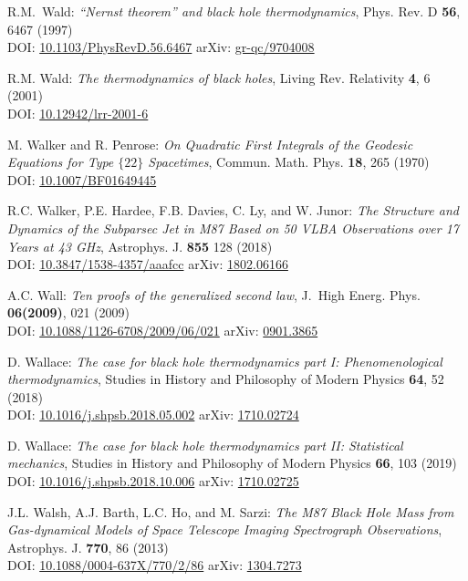 \begin{thebibliography}{123}
R.M.~Wald:
{\em ``Nernst theorem'' and black hole thermodynamics},
Phys. Rev. D {\bf 56}, 6467 (1997)\\
DOI: \href{https://doi.org/10.1103/PhysRevD.56.6467}{10.1103/PhysRevD.56.6467}\hfill
arXiv: \href{https://arxiv.org/abs/gr-qc/9704008}{gr-qc/9704008}

R.M. Wald: {\em The thermodynamics of black holes},
Living Rev. Relativity {\bf 4}, 6 (2001) \\
DOI: \href{https://doi.org/10.12942/lrr-2001-6}{10.12942/lrr-2001-6}

M. Walker and R. Penrose: {\em On Quadratic First Integrals of the Geodesic Equations
for Type $\{22\}$ Spacetimes},
Commun. Math. Phys. {\bf 18}, 265 (1970)\\
DOI: \href{https://doi.org/10.1007/BF01649445}{10.1007/BF01649445}

R.C. Walker, P.E. Hardee, F.B. Davies, C. Ly, and W. Junor:
{\em The Structure and Dynamics of the Subparsec Jet in M87 Based on 50 VLBA Observations over 17 Years at 43 GHz},
Astrophys. J. {\bf 855} 128 (2018)\\
DOI: \href{https://doi.org/10.3847/1538-4357/aaafcc}{10.3847/1538-4357/aaafcc}\hfill
arXiv: \href{https://arxiv.org/abs/1802.06166}{1802.06166}

A.C. Wall:
{\em Ten proofs of the generalized second law},
J.~High Energ. Phys. {\bf 06(2009)}, 021 (2009)\\
DOI: \href{https://doi.org/10.1088/1126-6708/2009/06/021}{10.1088/1126-6708/2009/06/021}\hfill
arXiv: \href{https://arxiv.org/abs/0901.3865}{0901.3865}

D. Wallace:
{\em The case for black hole thermodynamics part I: Phenomenological thermodynamics},
Studies in History and Philosophy of Modern Physics {\bf 64}, 52 (2018)\\
DOI: \href{https://doi.org/10.1016/j.shpsb.2018.05.002}{10.1016/j.shpsb.2018.05.002}\hfill
arXiv: \href{https://arxiv.org/abs/1710.02724}{1710.02724}

D. Wallace:
{\em The case for black hole thermodynamics part II: Statistical mechanics},
Studies in History and Philosophy of Modern Physics {\bf 66}, 103 (2019)\\
DOI: \href{https://doi.org/10.1016/j.shpsb.2018.10.006}{10.1016/j.shpsb.2018.10.006}\hfill
arXiv: \href{https://arxiv.org/abs/1710.02725}{1710.02725}

J.L. Walsh, A.J. Barth, L.C. Ho, and M. Sarzi:
{\em The M87 Black Hole Mass from Gas-dynamical Models of Space Telescope Imaging Spectrograph Observations},
Astrophys. J. {\bf 770}, 86 (2013)\\
DOI: \href{https://doi.org/10.1088/0004-637X/770/2/86}{10.1088/0004-637X/770/2/86}\hfill
arXiv: \href{https://arxiv.org/abs/1304.7273}{1304.7273}


\end{thebibliography}
